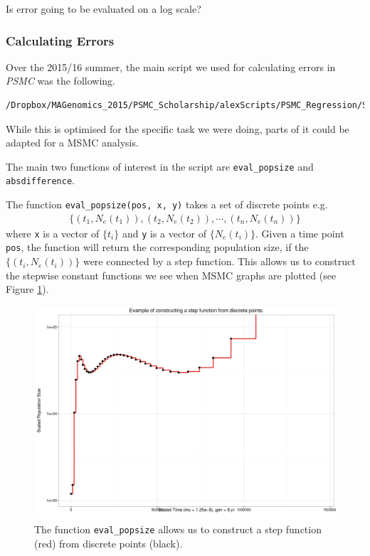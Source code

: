 \documentclass[11pt,a4paper]{article}
\begin{document}
Is error going to be evaluated on a log scale?

\subsubsection{Calculating Errors}
Over the 2015/16 summer, the main script we used for calculating errors in \emph{PSMC} was the following.
\begin{lstlisting}
/Dropbox/MAGenomics_2015/PSMC_Scholarship/alexScripts/PSMC_Regression/StringExtraction_ErrorAnalysis.R
\end{lstlisting}
While this is optimised for the specific task we were doing, parts of it could be adapted for a MSMC analysis.

The main two functions of interest in the script are \texttt{eval\_popsize} and \texttt{absdifference}.

The function \texttt{eval\_popsize(pos, x, y)} takes a set of discrete points e.g. 
\begin{eqnarray*}
\{(t_1, N_{e}(t_1)), (t_2, N_{e}(t_2)), \cdots,(t_n, N_{e}(t_n))\}
\end{eqnarray*}
where \texttt{x} is a vector of $\{t_i\}$ and \texttt{y} is a vector of $\{N_e(t_i)\}$. Given a time point \texttt{pos}, the function will return the corresponding population size, if the $\{(t_i,N_e(t_i)) \}$ were connected by a step function. This allows us to construct the stepwise constant functions we see when MSMC graphs are plotted (see Figure \ref{pointsToStep}).

\begin{figure}
\centering
\includegraphics[width=1\textwidth]{pix/pointsToStep}
\caption{The function \texttt{eval\_popsize} allows us to construct a step function (red) from discrete points (black).} \label{pointsToStep}
\end{figure}
\end{document}
